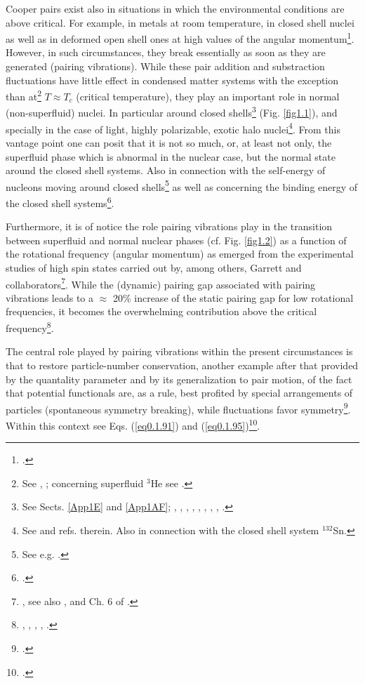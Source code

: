  Cooper pairs exist also in situations in which the environmental conditions are above critical. For example, in metals at room temperature, in closed shell nuclei as well as in deformed open shell ones at high values of the angular momentum\footnote{\cite{Shimizu:90}.}. However, in such circumstances, they break essentially as soon as they are generated (pairing vibrations). While these pair addition and substraction fluctuations have little effect in condensed matter systems with the exception than at\footnote{See \cite{Schmidt:68}, \cite{Schmid:69} \cite{Abrahams:68}; concerning superfluid $^3$He see \cite{Wolfe:78}.} $T\approx T_c$ (critical temperature), they play an important role in normal (non-superfluid) nuclei. In particular around  closed shells\footnote{See Sects. \ref{App1E} and \ref{App1AF}; \cite{Bohr:64}, \cite{Bes:66}, \cite{Hogassen:61}, \cite{Schmidt:72}, \cite{Schmidt:68}, \cite{Barranco:01}, \cite{Potel:13}, \cite{Potel:14}, \cite{Schmidt:64}.} (Fig. \ref{fig1.1}), and specially in the case of light, highly polarizable, exotic halo nuclei\footnote{See \cite{Potel:13} and refs. therein. Also \cite{Potel:13b} in connection with the closed shell system $^{132}$Sn.}. From this vantage point one can posit that it is not so much, or, at least not only, the superfluid phase which is abnormal in the nuclear case, but the normal state around the closed shell systems. Also in connection with the self-energy of nucleons moving around closed shells\footnote{See e.g. \cite{Bes:71,Flynn:71}.} as well as concerning the binding energy of the closed shell systems\footnote{\cite{Baroni:04}.}.
 
 
  Furthermore, it is of notice the role pairing vibrations play in the  transition between superfluid and normal nuclear phases (cf. Fig. \ref{fig1.2}) as a function of the rotational frequency (angular momentum) as emerged from the experimental studies of high spin states carried out by, among others, Garrett and collaborators\footnote{\cite{Garrett:85,Garrett:86}, see also \cite{Shimizu:89}, \cite{Barranco:87b} and Ch. 6 of \cite{Brink:05}.}.
 While the (dynamic) pairing gap associated with pairing vibrations leads to a $\approx$ 20\% increase of the static pairing gap for low rotational frequencies, it becomes the overwhelming contribution above the critical frequency\footnote{\cite{Shimizu:89}, \cite{Shimizu:90}, \cite{Shimizu:13},  \cite{Donau:99}, \cite{Shimizu:00}.}.
 
 
 
  The central role played by pairing vibrations within the present circumstances is that to restore particle-number conservation, another example after that provided by the quantality parameter and by its generalization to pair motion, of the fact that potential functionals are, as a rule, best profited by special arrangements of particles (spontaneous symmetry breaking), while fluctuations favor symmetry\footnote{\cite{Anderson:84,Anderson:76}.}. Within this context see Eqs. (\ref{eq0.1.91}) and (\ref{eq0.1.95})\footnote{\cite{Shimizu:13}.}.
  
